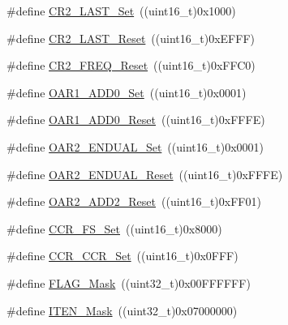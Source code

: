 \begin{DoxyCompactItemize}
\item 
\#define \mbox{\hyperlink{group___i2_c___private___defines_ga3604dd2f23b0f15a088ef6fe9731485a}{C\+R2\+\_\+\+L\+A\+S\+T\+\_\+\+Set}}~((uint16\+\_\+t)0x1000)
\item 
\#define \mbox{\hyperlink{group___i2_c___private___defines_ga904e044226182269485936bad8314f84}{C\+R2\+\_\+\+L\+A\+S\+T\+\_\+\+Reset}}~((uint16\+\_\+t)0x\+E\+F\+F\+F)
\item 
\#define \mbox{\hyperlink{group___i2_c___private___defines_ga2bcf74bd8fc3aaa931faf750d1afe405}{C\+R2\+\_\+\+F\+R\+E\+Q\+\_\+\+Reset}}~((uint16\+\_\+t)0x\+F\+F\+C0)
\item 
\#define \mbox{\hyperlink{group___i2_c___private___defines_gaeb56bf422fd13e68c82783df63f425ab}{O\+A\+R1\+\_\+\+A\+D\+D0\+\_\+\+Set}}~((uint16\+\_\+t)0x0001)
\item 
\#define \mbox{\hyperlink{group___i2_c___private___defines_gac5c2ac4577b70e1d7618b7fa1d715e3a}{O\+A\+R1\+\_\+\+A\+D\+D0\+\_\+\+Reset}}~((uint16\+\_\+t)0x\+F\+F\+F\+E)
\item 
\#define \mbox{\hyperlink{group___i2_c___private___defines_ga859551657f688e5efdb3f573e78ee979}{O\+A\+R2\+\_\+\+E\+N\+D\+U\+A\+L\+\_\+\+Set}}~((uint16\+\_\+t)0x0001)
\item 
\#define \mbox{\hyperlink{group___i2_c___private___defines_gaae86eb7689c73e34388cfbd03b8d9ecd}{O\+A\+R2\+\_\+\+E\+N\+D\+U\+A\+L\+\_\+\+Reset}}~((uint16\+\_\+t)0x\+F\+F\+F\+E)
\item 
\#define \mbox{\hyperlink{group___i2_c___private___defines_ga243036db699954e290f48e6743323054}{O\+A\+R2\+\_\+\+A\+D\+D2\+\_\+\+Reset}}~((uint16\+\_\+t)0x\+F\+F01)
\item 
\#define \mbox{\hyperlink{group___i2_c___private___defines_ga3af49180596b283514782708ac85606e}{C\+C\+R\+\_\+\+F\+S\+\_\+\+Set}}~((uint16\+\_\+t)0x8000)
\item 
\#define \mbox{\hyperlink{group___i2_c___private___defines_ga07695fd4c06df54def77840118f83a0d}{C\+C\+R\+\_\+\+C\+C\+R\+\_\+\+Set}}~((uint16\+\_\+t)0x0\+F\+F\+F)
\item 
\#define \mbox{\hyperlink{group___i2_c___private___defines_ga2be62bf481cd44de9ab604efe5595ff6}{F\+L\+A\+G\+\_\+\+Mask}}~((uint32\+\_\+t)0x00\+F\+F\+F\+F\+F\+F)
\item 
\#define \mbox{\hyperlink{group___i2_c___private___defines_gab99e12994e073c2a681a6cf68492b3e2}{I\+T\+E\+N\+\_\+\+Mask}}~((uint32\+\_\+t)0x07000000)
\end{DoxyCompactItemize}


